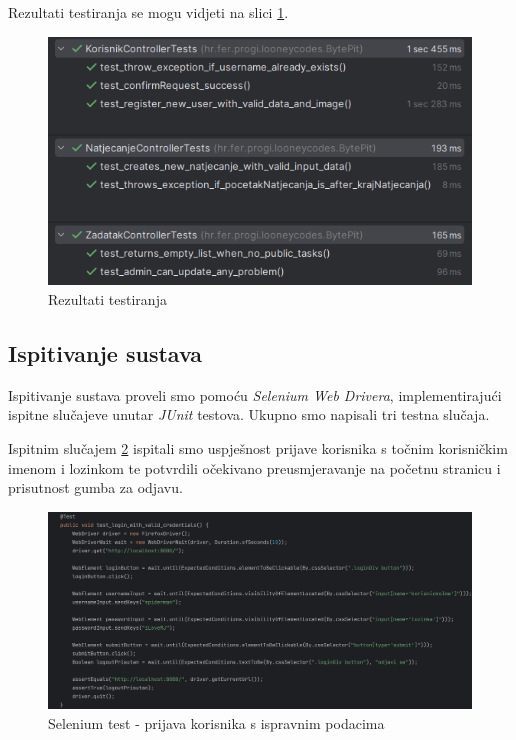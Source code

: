 \noindent Rezultati testiranja se mogu vidjeti na slici \ref{fig:test_rezultati}.

\begin{figure}[H]
	\includegraphics[scale=0.8]{slike/test_rezultati.png}
	\centering
	\caption{Rezultati testiranja}
	\label{fig:test_rezultati}
\end{figure}

\subsection{Ispitivanje sustava}

Ispitivanje sustava proveli smo pomoću \textit{Selenium Web Drivera}, implementirajući ispitne slučajeve unutar \textit{JUnit} testova. Ukupno smo napisali tri testna slučaja.

\vspace{1em}

Ispitnim slučajem \ref{fig:selenium1} ispitali smo uspješnost prijave korisnika s točnim korisničkim imenom i lozinkom te potvrdili očekivano preusmjeravanje na početnu stranicu i prisutnost gumba za odjavu.


\begin{figure}[H]
	\includegraphics[scale=0.135]{slike/selenium_test1.png}
	\centering
	\caption{Selenium test - prijava korisnika s ispravnim podacima}
	\label{fig:selenium1}
\end{figure}


